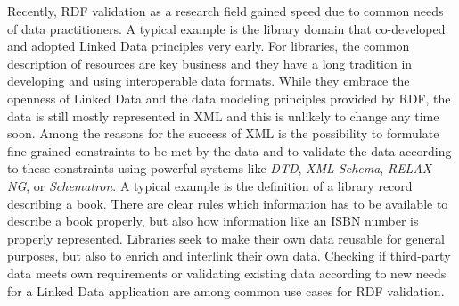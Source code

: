\documentclass[a4paper,fontsize=11pt]{scrartcl}
\begin{document}
Recently, RDF validation as a research field gained speed due to common needs of data practitioners. A typical example is the library domain that co-developed and adopted Linked Data principles very early. For libraries, the common description of resources are key business and they have a long tradition in developing and using interoperable data formats. While they embrace the openness of Linked Data and the data modeling principles provided by RDF, the data is still mostly represented in XML and this is unlikely to change any time soon. 
Among the reasons for the success of XML is the possibility to formulate fine-grained constraints to be met by the data and to validate the data according to these constraints using powerful systems like \emph{DTD}, \emph{XML Schema}, \emph{RELAX NG}, or \emph{Schematron}.
A typical example is the definition of a library record describing a book. There are clear rules which information has to be available to describe a book properly, but also how information like an ISBN number is properly represented. Libraries seek to make their own data reusable for general purposes, but also to enrich and interlink their own data. Checking if third-party data meets own requirements or validating existing data according to new needs for a Linked Data application are among common use cases for RDF validation.
\end{document}
